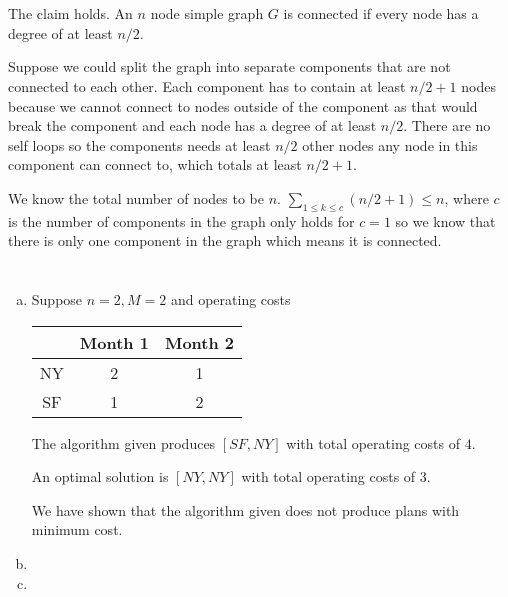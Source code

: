 \documentclass[12pt, a4paper]{article}
\begin{document}
\section{} %

\section{} %
The claim holds. An $n$ node simple graph $G$ is connected if every node has a degree of at least $n/2$.

Suppose we could split the graph into separate components that are not connected to each other. Each component has to contain at least $n/2 + 1$ nodes because we cannot connect to nodes outside of the component as that would break the component and each node has a degree of at least $n/2$. There are no self loops so the components needs at least $n/2$ other nodes any node in this component can connect to, which totals at least $n/2 + 1$.

We know the total number of nodes to be $n$. $\sum_{1 \leq k \leq c} (n/2 + 1) \leq n$, where $c$ is the number of components in the graph only holds for $c = 1$ so we know that there is only one component in the graph which means it is connected.

\section{} %
\begin{enumerate}[(a)]
	\item %
	Suppose $n = 2, M = 2$ and operating costs\\
	\begin{tabular}{|c||c|c|}
		\hline
		& Month 1 & Month 2\\
		\hline
		NY & 2 & 1\\
		\hline
		SF & 1 & 2\\
		\hline
	\end{tabular}

	The algorithm given produces $[SF, NY]$ with total operating costs of $4$.

	An optimal solution is $[NY, NY]$ with total operating costs of $3$.

	We have shown that the algorithm given does not produce plans with minimum cost.

	\item %
	\item %
\end{enumerate}
\end{document}
